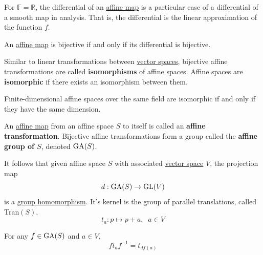   For $\mathbb{F} = \mathbb{R}$, the differential of an \hyperref[def:affine-map]{affine map} is a particular case of a differential of a smooth map in analysis. That is, the differential is the linear approximation of the function $f$. 

  \begin{theorem}
    \label{thm:bijectivity-via-the-differential}
    An \hyperref[def:affine-map]{affine map} is bijective if and only if its differential is bijective. 
  \end{theorem}

  \begin{definition}
    \label{def:isomorphism-of-affine-spaces}
    Similar to linear transformations between \hyperref[def:vector-space]{vector spaces}, bijective affine transformations are called \textbf{isomorphisms} of affine spaces. Affine spaces are \textbf{isomorphic} if there exists an isomorphism between them. 
  \end{definition}

  \begin{corollary}
    \label{thm:classification-of-affine-spaces-by-dimension}
    Finite-dimensional affine spaces over the same field are isomorphic if and only if they have the same dimension. 
  \end{corollary}

  \begin{definition}
    \label{def:affine-transformation-and-the-affine-group}
    An \hyperref[def:affine-map]{affine map} from an affine space $S$ to itself is called an \textbf{affine transformation}. Bijective affine transformations form a group called the \textbf{affine group of $S$}, denoted $\operatorname{GA}(S)$. 
  \end{definition}

  It follows that given affine space $S$ with associated \hyperref[def:vector-space]{vector space} $V$, the projection map
  \begin{equation}
    d: \operatorname{GA}(S) \to \operatorname{GL}(V)
  \end{equation}
  is a \hyperref[def:group-homomorphism]{group homomorphism}. It's kernel is the group of parallel translations, called Tran$(S)$. 
  \begin{equation}
    t_a : p \mapsto p + a, \;\; a \in V
  \end{equation}

  \begin{theorem}
    \label{thm:conjugation-of-a-translation}
    For any $f \in \operatorname{GA}(S)$ and $a \in V$, 
    \begin{equation}
      f t_a f^{-1} = t_{df(a)}
    \end{equation}
  \end{theorem}

